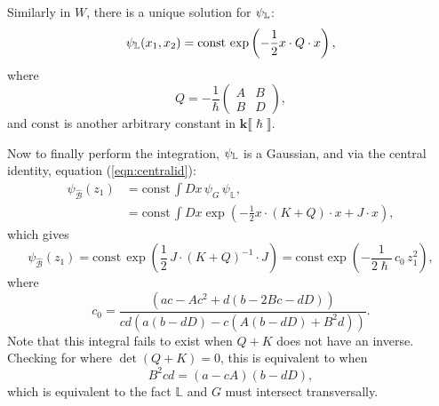     Similarly in \(W\), there is a unique solution for \( \psi_{\mathbb{L}}\):
    \begin{align*}
        \psi_{\mathbb{L}}(x_1,x_2) =  \mathrm{const} \, \exp \left( -\frac{1}{2}   x \cdot Q \cdot  x \right),
    \end{align*}
    where 
    \[ Q = - \frac{1}{\hslash} \left( \begin{array}{cc}
        A  &  B \\
        B & D  
    \end{array}\right),\]
    and \( \mathrm{const}\) is another arbitrary constant in \( \mathbf{k}\lBrack \hslash \rBrack\).
    
    Now to finally perform the integration, \( \psi_{\mathbb{L}}\) is a Gaussian, and via the central identity, equation (\ref{eqn:centralid}):
    \begin{align*} \psi_{\widehat{\mathcal{B}}}(z_1) &= \mathrm{const} \, \int D x \, \psi_{G} \,  \psi_{\mathbb{L}},  \\ 
    &= \mathrm{const} \, \int Dx \exp \left( -\frac{1}{2} x \cdot (K+Q) \cdot x + J \cdot x \right), 
    \end{align*}
    which gives
    \begin{equation*} \psi_{\widehat{\mathcal{B}}}(z_1) = \mathrm{const}\, \exp \left( \frac12\, J\cdot (K+Q)^{-1} \cdot J \right) = \mathrm{const} \exp\left( -\frac{1}{2 \hslash}\, c_0\, z_1^2\right),
    \end{equation*}
    where 
    \[ c_0 = \frac{\left(a c-A c^2+d (b-2 B c-d D)\right)}{ c d  \left(a (b-d D)-c \left(A (b-d D)+B^2 d\right)\right)}.\]
    Note that this integral fails to exist when \(Q+K\) does not have an inverse.  Checking for where \( \det(Q+K) = 0\), this is equivalent to when
    \[ B^2 c d = (a -  c A) ( b - d D), \]
    which is equivalent to the fact \( \mathbb{L}\) and \(G\) must intersect transversally. 
    

